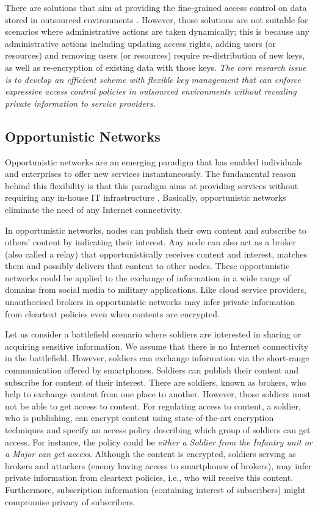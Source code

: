 \documentclass[epsfig,a4paper,11pt,titlepage]{book}
\numberwithin{algorithm}{chapter}
\begin{document}
There are solutions that aim at providing the fine-grained access control on data stored in outsourced environments \cite{DeCapitanidiVimercati:2013, Raykova:2012, Vimercati:2007:CSAW, Vimercati:2007:VLDB}. However, those solutions are not suitable for scenarios where administrative actions are taken dynamically; this is because any administrative actions including updating access rights, adding users (or resources) and removing users (or resources) require re-distribution of new keys, as well as re-encryption of existing data with those keys. \emph{The core research issue is to develop an efficient scheme with flexible key management that can enforce expressive access control policies in outsourced environments without revealing private information to service providers.}

\subsection{Opportunistic Networks}
Opportunistic networks are an emerging paradigm that has enabled individuals and enterprises to offer new services instantaneously. The fundamental reason behind this flexibility is that this paradigm aims at providing services without requiring any in-house \gls{IT} infrastructure \cite{Pelusi:2006}. Basically, opportunistic networks eliminate the need of any Internet connectivity.

In opportunistic networks, nodes can publish their own content and subscribe to others' content by indicating their interest. Any node can also act as a broker (also called a relay) that opportunistically receives content and interest, matches them and possibly delivers that content to other nodes. These opportunistic networks could be applied to the exchange of information in a wide range of domains from social media to military applications. Like cloud service providers, unauthorised brokers in opportunistic networks may infer private information from cleartext policies even when contents are encrypted.

Let us consider a battlefield scenario where soldiers are interested in sharing or acquiring sensitive information. We assume that there is no Internet connectivity in the battlefield. However, soldiers can exchange information via the short-range communication offered by smartphones. Soldiers can publish their content and subscribe for content of their interest. There are soldiers, known as brokers, who help to exchange content from one place to another. However, those soldiers must not be able to get access to content. For regulating access to content, a soldier, who is publishing, can encrypt content using state-of-the-art encryption techniques and specify an access policy describing which group of soldiers can get access. For instance, the policy could be \emph{either a Soldier from the Infantry unit or a Major can get access}. Although the content is encrypted, soldiers serving as brokers and attackers (enemy having access to smartphones of brokers), may infer private information from cleartext policies, i.e., who will receive this content. Furthermore, subscription information (containing interest of subscribers) might compromise privacy of subscribers.
\end{document}
